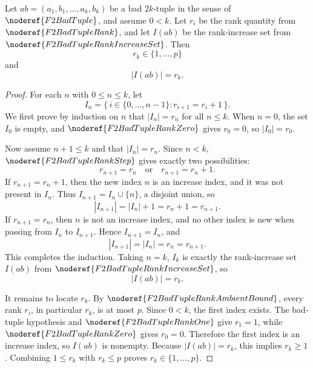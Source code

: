 \begin{helper}
Let \(ab=(a_1,b_1,\ldots,a_k,b_k)\) be a bad \(2k\)-tuple in the sense of
\(\noderef{F2BadTuple}\), and assume \(0<k\). Let \(r_i\) be the rank quantity
from \(\noderef{F2BadTupleRank}\), and let \(I(ab)\) be the rank-increase set
from \(\noderef{F2BadTupleRankIncreaseSet}\). Then
\[
  r_k\in\{1,\ldots,p\}
\]
and
\[
  |I(ab)|=r_k.
\]
\end{helper}
\begin{proof}
For each \(n\) with \(0\le n\le k\), let
\[
  I_n=\{\,i\in\{0,\ldots,n-1\}: r_{i+1}=r_i+1\,\}.
\]
We first prove by induction on \(n\) that \(|I_n|=r_n\) for all \(n\le k\).
When \(n=0\), the set \(I_0\) is empty, and \(\noderef{F2BadTupleRankZero}\)
gives \(r_0=0\), so \(|I_0|=r_0\).

Now assume \(n+1\le k\) and that \(|I_n|=r_n\). Since \(n<k\),
\(\noderef{F2BadTupleRankStep}\) gives exactly two possibilities:
\[
  r_{n+1}=r_n
  \quad\text{or}\quad
  r_{n+1}=r_n+1.
\]
If \(r_{n+1}=r_n+1\), then the new index \(n\) is an increase index, and it was
not present in \(I_n\). Thus \(I_{n+1}=I_n\cup\{n\}\), a disjoint union, so
\[
  |I_{n+1}|=|I_n|+1=r_n+1=r_{n+1}.
\]
If \(r_{n+1}=r_n\), then \(n\) is not an increase index, and no other index is
new when passing from \(I_n\) to \(I_{n+1}\). Hence \(I_{n+1}=I_n\), and
\[
  |I_{n+1}|=|I_n|=r_n=r_{n+1}.
\]
This completes the induction. Taking \(n=k\), \(I_k\) is exactly the
rank-increase set \(I(ab)\) from \(\noderef{F2BadTupleRankIncreaseSet}\), so
\[
  |I(ab)|=r_k.
\]

It remains to locate \(r_k\). By \(\noderef{F2BadTupleRankAmbientBound}\), every
rank \(r_i\), in particular \(r_k\), is at most \(p\). Since \(0<k\), the first
index exists. The bad-tuple hypothesis and \(\noderef{F2BadTupleRankOne}\) give
\(r_1=1\), while \(\noderef{F2BadTupleRankZero}\) gives \(r_0=0\). Therefore the
first index is an increase index, so \(I(ab)\) is nonempty. Because
\(|I(ab)|=r_k\), this implies \(r_k\ge1\). Combining \(1\le r_k\) with
\(r_k\le p\) proves \(r_k\in\{1,\ldots,p\}\).
\end{proof}
